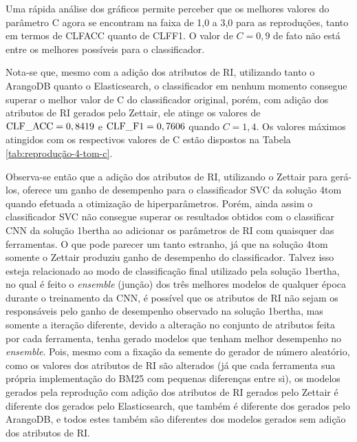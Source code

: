 			

			
			
			Uma rápida análise dos gráficos permite perceber que os melhores valores do parâmetro C agora se encontram na faixa de 1,0 a 3,0 para as reproduções, tanto em termos de CLF\underscore{}ACC quanto de CLF\underscore{}F1.
			O valor de $C = 0,9$ de fato não está entre os melhores possíveis para o classificador.
			
			Nota-se que, mesmo com a adição dos atributos de RI, utilizando tanto o ArangoDB quanto o Elasticsearch, o classificador em nenhum momento consegue superar o melhor valor de C do classificador original, porém, com adição dos atributos de RI gerados pelo Zettair, ele atinge os valores de $\text{CLF{\_\allowbreak\hspace{0pt}}{}ACC} = 0,8419$ e $\text{CLF{\_\allowbreak\hspace{0pt}}{}F1} = 0,7606$ quando $C = 1,4$.
			Os valores máximos atingidos com os respectivos valores de C estão dispostos na Tabela \ref{tab:reprodução-4-tom-c}.

			

			Observa-se então que a adição dos atributos de RI, utilizando o Zettair para gerá-los, oferece um ganho de desempenho para o classificador SVC da solução 4\underscore{}tom quando efetuada a otimização de hiperparâmetros.
			Porém, ainda assim o classificador SVC não consegue superar os resultados obtidos com o classificar CNN da solução 1\underscore{}bertha ao adicionar os parâmetros de RI com quaisquer das ferramentas.
			O que pode parecer um tanto estranho, já que na solução 4\underscore{}tom somente o Zettair produziu ganho de desempenho do classificador.
			Talvez isso esteja relacionado ao modo de classificação final utilizado pela solução 1\underscore{}bertha, no qual é feito o \textit{ensemble} (junção) dos três melhores modelos de qualquer época durante o treinamento da CNN, é possível que os atributos de RI não sejam os responsáveis pelo ganho de desempenho observado na solução 1\underscore{}bertha, mas somente a iteração diferente, devido a alteração no conjunto de atributos feita por cada ferramenta, tenha gerado modelos que tenham melhor desempenho no \textit{ensemble}.
			Pois, mesmo com a fixação da semente do gerador de número aleatório, como os valores dos atributos de RI são alterados (já que cada ferramenta sua própria implementação do BM25 com pequenas diferenças entre si), os modelos gerados pela reprodução com adição dos atributos de RI gerados pelo Zettair é diferente dos gerados pelo Elasticsearch, que também é diferente dos gerados pelo ArangoDB, e todos estes também são diferentes dos modelos gerados sem adição dos atributos de RI.



